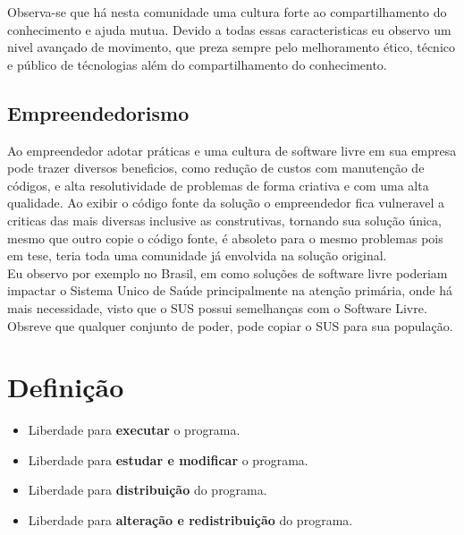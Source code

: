 \documentclass[12pt, onecolumn]{article}
\begin{document}
             \hspace{2cm} Observa-se que há nesta comunidade uma cultura forte ao compartilhamento do conhecimento e ajuda mutua.
                Devido a todas essas caracteristicas eu observo um nivel avançado de movimento, que  preza sempre pelo melhoramento 
                ético, técnico e público de técnologias além do compartilhamento do conhecimento.
        
        \subsection{Empreendedorismo}
            \hspace{2cm}    Ao empreendedor adotar práticas e uma cultura de software livre em sua empresa pode trazer diversos 
                beneficios, como redução de custos com manutenção de códigos, e alta resolutividade de problemas de forma criativa
                e com uma alta qualidade. Ao exibir o código fonte da solução o empreendedor fica vulneravel a criticas das mais diversas
                inclusive as construtivas, tornando sua solução única, mesmo que outro copie o código fonte, é absoleto para o mesmo problemas
                pois em tese, teria toda uma comunidade já envolvida na solução original. \\

            \hspace{2cm}   Eu observo por exemplo no Brasil, em como soluções de software livre poderiam impactar o Sistema Unico de Saúde
                principalmente na atenção primária, onde há mais necessidade, visto que o SUS possui semelhanças com o Software Livre.
                Obsreve que qualquer conjunto de poder, pode copiar o SUS para sua população.

    \section{Definição}
        \begin{itemize}
            \item Liberdade para {\bf executar} o programa.
            \item Liberdade para {\bf estudar e modificar} o programa.
            \item Liberdade para {\bf distribuição} do programa.
            \item Liberdade para {\bf alteração e redistribuição} do programa.
        \end{itemize}
\end{document}
